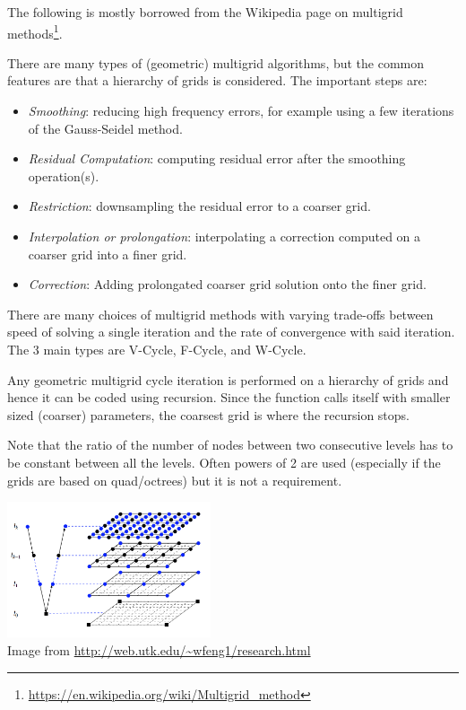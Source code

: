 

The following is mostly borrowed from the Wikipedia page on multigrid methods\footnote{\url{https://en.wikipedia.org/wiki/Multigrid_method}}.

There are many types of (geometric) multigrid algorithms, but the common features are that a hierarchy of grids is considered. The important steps are:

\begin{itemize}
\item {\sl Smoothing}: reducing high frequency errors, for example using a few iterations of the Gauss-Seidel method.
\item {\sl Residual Computation}: computing residual error after the smoothing operation(s).
\item {\sl Restriction}: downsampling the residual error to a coarser grid.
\item {\sl Interpolation or prolongation}: interpolating a correction computed on a coarser grid into a finer grid.
\item {\sl Correction}: Adding prolongated coarser grid solution onto the finer grid.
\end{itemize}

There are many choices of multigrid methods with varying trade-offs between speed of solving a single iteration and the rate of convergence with said iteration. The 3 main types are V-Cycle, F-Cycle, and W-Cycle.

Any geometric multigrid cycle iteration is performed on a hierarchy of grids and hence it can be coded using recursion. Since the function calls itself with smaller sized (coarser) parameters, the coarsest grid is where the recursion stops.

Note that the ratio of the number of nodes between two consecutive levels has to be constant between all the levels. Often powers of 2 are used (especially if the grids are based on quad/octrees) but it is not a requirement. 



\begin{center}
\includegraphics[width=6cm]{images/multigrid/mggrid}\\
{\scriptsize Image from \url{http://web.utk.edu/~wfeng1/research.html}}
\end{center}



